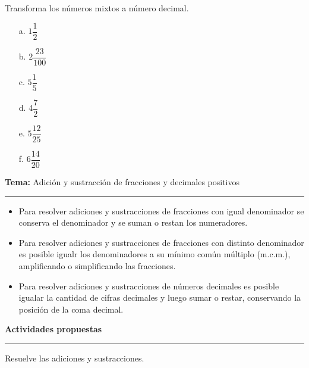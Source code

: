 \documentclass[spanish,letterpaper, 11pt, addpoints, answers]{exam}
\begin{document}
\begin{questions}
\begin{multicols}{2}
  \end{multicols}

\question Transforma los números mixtos a número decimal.

\begin{multicols}{2}

  \begin{itemize}
    \item[a.] $1\dfrac{1}{2}$
    \item[b.] $2\dfrac{23}{100}$
    \item[c.] $5\dfrac{1}{5}$
    \item[d.] $4\dfrac{7}{2}$
    \item[e.] $5\dfrac{12}{25}$
    \item[f.] $6\dfrac{14}{20}$
  \end{itemize}
  
  \end{multicols}

\newpage
  \vspace{0.1in}
  \parbox{6in}{
  \textbf{Tema:} Adición y sustracción de fracciones y decimales positivos}
  \vspace{0.15in}
  \hrule 
  
  \begin{itemize}
    \item Para resolver adiciones y sustracciones de fracciones con igual denominador se conserva el denominador y se suman o restan los numeradores.
  
    \item Para resolver adiciones y sustracciones de fracciones con distinto denominador es posible igualr los denominadores a su mínimo común múltiplo (m.c.m.), amplificando o simplificando las fracciones.
    \item Para resolver adiciones y sustracciones de números decimales es posible igualar la cantidad de cifras decimales y luego sumar o restar, conservando la posición de la coma decimal.

    
  \end{itemize}
  
  \parbox{6in}{
  \textbf{Actividades propuestas}}
  \vspace{0.15in}
  \hrule 

  \question Resuelve las adiciones y sustracciones.

  \begin{multicols}{2}
    

\end{multicols}
\end{questions}
\end{document}
